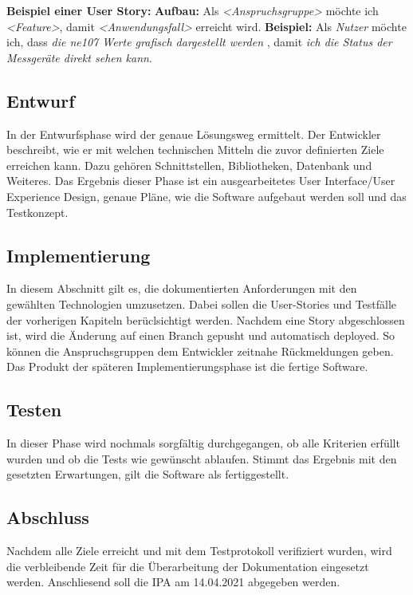 \textbf{Beispiel einer User Story:}
\newline
\textbf{Aufbau:} Als \textit{<Anspruchsgruppe>} möchte ich \textit{<Feature>}, damit \textit{<Anwendungsfall>} erreicht wird.
\linebreak
\textbf{Beispiel:} Als \textit{Nutzer} möchte ich, dass \textit{die ne107 Werte grafisch dargestellt werden} , damit \textit{ich die Status der Messgeräte direkt sehen kann}.

\subsection{Entwurf}

In der Entwurfsphase wird der genaue Lösungsweg ermittelt. Der Entwickler beschreibt, wie er mit welchen technischen Mitteln die zuvor definierten Ziele erreichen kann. Dazu gehören Schnittstellen, Bibliotheken, Datenbank und Weiteres. Das Ergebnis dieser Phase ist ein ausgearbeitetes User Interface/User Experience Design, genaue Pläne, wie die Software aufgebaut werden soll und das Testkonzept.

\subsection{Implementierung}

In diesem Abschnitt gilt es, die dokumentierten Anforderungen mit den gewählten Technologien umzusetzen. Dabei sollen die User-Stories und Testfälle der vorherigen Kapiteln berüclsichtigt werden.
\newline
Nachdem eine Story abgeschlossen ist, wird die Änderung auf einen Branch gepusht und automatisch deployed. So können die Anspruchsgruppen dem Entwickler zeitnahe Rückmeldungen geben. Das Produkt der späteren Implementierungsphase ist die fertige Software.


\subsection{Testen}

In dieser Phase wird nochmals sorgfältig durchgegangen, ob alle Kriterien erfüllt wurden und ob die Tests wie gewünscht ablaufen. Stimmt das Ergebnis mit den gesetzten Erwartungen, gilt die Software als fertiggestellt.

\subsection{Abschluss}

Nachdem alle Ziele erreicht und mit dem Testprotokoll verifiziert wurden, wird die verbleibende Zeit für die Überarbeitung der Dokumentation eingesetzt werden. Anschliesend soll die IPA am 14.04.2021 abgegeben werden.